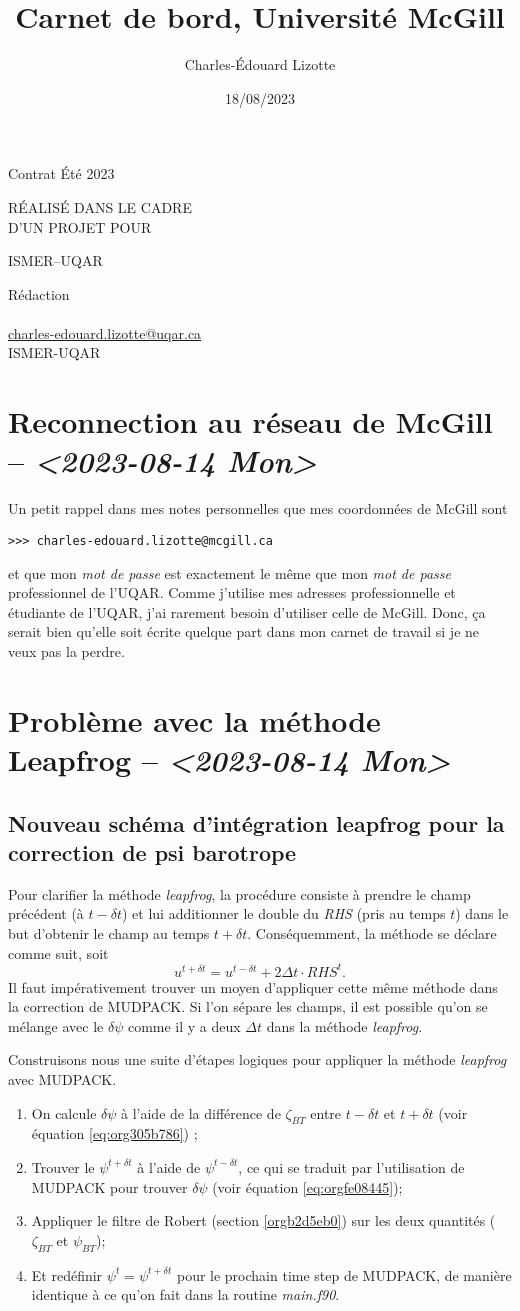 \documentclass[10pt]{article}
\author{Charles-Édouard Lizotte}
\date{18/08/2023}
\title{Carnet de bord, Université McGill}
\makeatletter
\numberwithin{equation}{section}
\newcommand{\mytitlepage}{
\begin{titlepage}
\begin{center}
{\Large Contrat Été 2023 \par}
\vspace{2cm}
{\Large \MakeUppercase{\thetitle} \par}
\vspace{2cm}
RÉALISÉ DANS LE CADRE\\ D'UN PROJET POUR \par
\vspace{2cm}
{\Large ISMER--UQAR \par}
\vspace{2cm}
{\thedate}
\end{center}
\vfill
Rédaction \\
{\theauthor}\\
\url{charles-edouard.lizotte@uqar.ca}\\
ISMER-UQAR
\end{titlepage}
}
\makeatother
\begin{document}
\mytitlepage
\tableofcontents\newpage

\section{Reconnection au réseau de McGill -- \textit{<2023-08-14 Mon>}}
\label{sec:org7601a85}
Un petit rappel dans mes notes personnelles que mes coordonnées de McGill sont
\begin{verbatim}
>>> charles-edouard.lizotte@mcgill.ca
\end{verbatim}
et que mon \emph{mot de passe} est exactement le même que mon \emph{mot de passe} professionnel de l'UQAR.
Comme j'utilise mes adresses professionnelle et étudiante de l'UQAR, j'ai rarement besoin d'utiliser celle de McGill.
Donc, ça serait bien qu'elle soit écrite quelque part dans mon carnet de travail si je ne veux pas la perdre.


\section{Problème avec la méthode Leapfrog -- \textit{<2023-08-14 Mon>}}
\label{sec:org5e5e5cd}

\subsection{Nouveau schéma d'intégration leapfrog pour la correction de psi barotrope}
\label{sec:orgc6f5aed}
Pour clarifier la méthode \emph{leapfrog}, la procédure consiste à prendre le champ précédent (à \(t-\delta t\)) et lui additionner le double du \emph{RHS} (pris au temps \(t\)) dans le but d'obtenir le champ au temps \(t+\delta t\).
Conséquemment, la méthode se déclare comme suit, soit
\begin{equation}
   u^{t+\delta t} = u^{t-\delta t} + 2\Delta t\cdot RHS^t.
\end{equation}
Il faut impérativement trouver un moyen d'appliquer cette même méthode dans la correction de MUDPACK.
Si l'on sépare les champs, il est possible qu'on se mélange avec le \(\delta \psi\) comme il y a deux \(\Delta t\) dans la méthode \emph{leapfrog}.\bigskip

Construisons nous une suite d'étapes logiques pour appliquer la méthode \emph{leapfrog} avec MUDPACK.
\begin{enumerate}
\item On calcule \(\delta \psi\) à l'aide de la différence de \(\zeta_{BT}\) entre \(t-\delta t\) et \(t+\delta t\) (voir équation \ref{eq:org305b786}) ;
\item Trouver le \(\psi^{t+\delta t}\) à l'aide de \(\psi^{t-\delta t}\), ce qui se traduit par l'utilisation de MUDPACK pour trouver \(\delta \psi\) (voir équation \ref{eq:orgfe08445});
\item Appliquer le filtre de Robert (section \ref{orgb2d5eb0})  sur les deux quantités (\(\zeta_{BT}\) et \(\psi_{BT}\));
\item Et redéfinir \(\psi^t = \psi^{t+\delta t}\) pour le prochain time step de MUDPACK, de manière identique à ce qu'on fait dans la routine \emph{main.f90}.
\end{enumerate}
\end{document}
